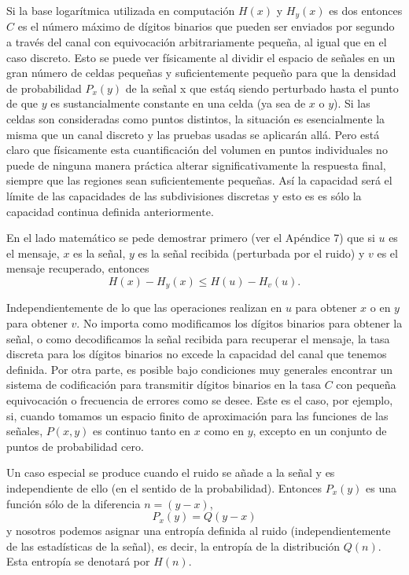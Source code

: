 Si la base logar\'itmica utilizada en computaci\'on $H(x)$ y
$H_{y}(x)$ es dos entonces $C$ es el n\'umero m\'aximo de d\'igitos
binarios que pueden ser enviados por segundo a trav\'es del canal con
equivocaci\'on arbitrariamente peque\~na, al igual que en el caso
discreto. Esto se puede ver f\'isicamente al dividir el espacio de
se\~nales en un gran n\'umero de celdas peque\~nas y suficientemente
peque\~no para que la densidad de probabilidad $P_{x}(y)$ de la
se\~nal x que est\'{a}q siendo perturbado hasta el punto de que $y$ es
sustancialmente constante en una celda (ya sea de $x$ o $y$). Si las
celdas son consideradas como puntos distintos, la situaci\'on es
esencialmente la misma que un canal discreto y las pruebas usadas se
aplicar\'an all\'{a}. Pero est\'{a} claro que f\'isicamente esta
cuantificaci\'on del volumen en puntos individuales no puede de
ninguna manera pr\'actica alterar significativamente la respuesta
final, siempre que las regiones sean suficientemente peque\~nas. As\'i
la capacidad ser\'{a} el l\'imite de las capacidades de las
subdivisiones discretas y esto es es s\'olo la capacidad continua
definida anteriormente.
	
En el lado matem\'atico se pede demostrar primero (ver el Ap\'endice
7) que si $u$ es el mensaje, $x$ es la se\~nal, $y$ es la se\~nal
recibida (perturbada por el ruido) y $v$ es el mensaje recuperado,
entonces 
\begin{equation} 
H(x) - H_{y}(x) \le H(u) - H_{v}(u).  
\end{equation}
	
Independientemente de lo que las operaciones realizan en $u$ para
obtener $x$ o en $y$ para obtener $v$. No importa como modificamos los
d\'igitos binarios para obtener la se\~nal, o como decodificamos la
se\~nal recibida para recuperar el mensaje, la tasa discreta para los
d\'igitos binarios no excede la capacidad del canal que tenemos
definida. Por otra parte, es posible bajo condiciones muy generales
encontrar un sistema de codificaci\'on para transmitir d\'igitos
binarios en la tasa $C$ con peque\~na equivocaci\'on o frecuencia de
errores como se desee. Este es el caso, por ejemplo, si, cuando
tomamos un espacio finito de aproximaci\'on para las funciones de las
se\~nales, $P(x,y)$ es continuo tanto en $x$ como en $y$, excepto en
un conjunto de puntos de probabilidad cero.
	
Un caso especial se produce cuando el ruido se a\~nade a la se\~nal y
es independiente de ello (en el sentido de la
probabilidad). Entonces $P_{x}(y)$ es una funci\'on s\'olo de
la diferencia $n = (y-x)$, 
\begin{equation} 
P_{x}(y) = Q(y - x)
\end{equation}
y nosotros podemos asignar una entrop\'ia definida al ruido
(independientemente de las estad\'isticas de la se\~nal), es decir, la
entrop\'ia de la distribuci\'on $Q(n)$. Esta entrop\'ia se denotar\'a
por $H(n)$.


